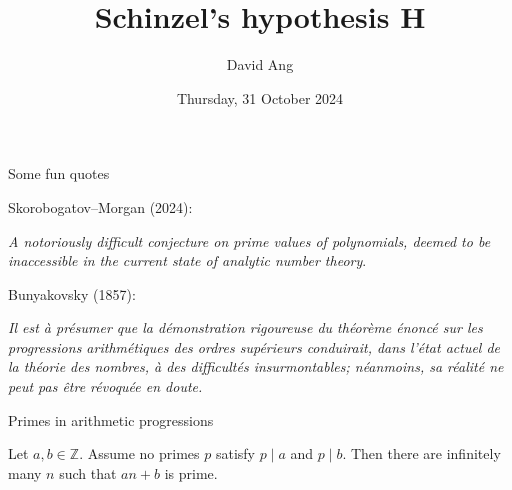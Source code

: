 \documentclass[10pt]{beamer}
\title{Schinzel's hypothesis H}
\author{David Ang}
\institute{Open problems in number theory}
\date{Thursday, 31 October 2024}
\begin{document}
\frame{\titlepage}

\begin{frame}{Some fun quotes}

\begin{center}
Skorobogatov--Morgan (2024):

\vspace{0.5cm} \emph{A notoriously difficult conjecture on prime values of polynomials, deemed to be inaccessible in the current state of analytic number theory}.
\end{center}

\pause

\vspace{0.5cm}

\begin{center}
Bunyakovsky (1857):

\vspace{0.5cm} \emph{Il est \`a pr\'esumer que la d\'emonstration rigoureuse du th\'eor\`eme \'enonc\'e sur les progressions arithm\'etiques des ordres sup\'erieurs conduirait, dans l'\'etat actuel de la th\'eorie des nombres, \`a des difficult\'es insurmontables; n\'eanmoins, sa r\'ealit\'e ne peut pas \^etre r\'evoqu\'ee en doute.}
\end{center}

\end{frame}

\begin{frame}[t]{Primes in arithmetic progressions}

\begin{theorem}[Dirichlet, 1837]
Let $ a, b \in \mathbb{Z} $. Assume no primes $ p $ satisfy $ p \mid a $ and $ p \mid b $. Then there are infinitely many $ n $ such that $ an + b $ is prime.
\end{theorem}

\pause

\vspace{0.5cm}


\end{frame}
\end{document}
